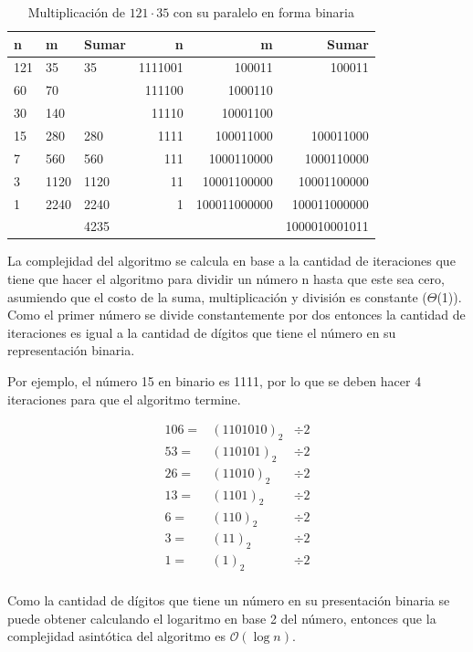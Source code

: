\documentclass[10pt,journal,compsoc]{IEEEtran}
\begin{document}
\begin{table}[t]
\centering
\label{tab:eje2}
\begin{tabular}{ll|l|rr|r}
n   & m    & Sumar & n & m & Sumar \\ \hline
121 & 35   & 35   & 1111001 & 100011& 100011  \\
60  & 70   &    & 111100 & 1000110  &   \\
30  & 140  &     & 11110 & 10001100  &  \\
15  & 280  & 280  & 1111 & 100011000 & 100011000 \\
7   & 560  & 560 & 111 & 1000110000  &  1000110000 \\
3   & 1120 & 1120 & 11 & 10001100000 &   10001100000 \\
1   & 2240 & 2240   & 1 & 100011000000 & 100011000000 \\ \hline
    &      & 4235 & & &1000010001011 
\end{tabular}
\caption{Multiplicación de $121\cdot 35$ con su paralelo en forma binaria}
\end{table}


La complejidad del algoritmo se calcula en base a la cantidad de iteraciones que tiene que hacer el algoritmo para dividir un número n hasta que este sea cero, asumiendo que el costo de la suma, multiplicación y división es constante ($\Theta$(1)). Como el primer número se divide constantemente por dos entonces la cantidad de iteraciones es igual a la cantidad de dígitos que tiene el número en su representación binaria. 

Por ejemplo, el número 15 en binario es 1111, por lo que se deben hacer 4 iteraciones para que el algoritmo termine.

\begin{center}

\[
\begin{array}{rll}
106 =  & (1101010)_2 & \div  2\\
53 = & (110101)_2 & \div 2 \\
26 = & (11010)_2 & \div 2 \\
13 = & (1101)_2 & \div 2 \\
6 = & (110)_2 & \div 2 \\
3 = & (11)_2 & \div 2 \\
1 = & (1)_2 & \div 2 \\
\end{array} 
\]
\end{center}

Como la cantidad de dígitos que tiene un número en su presentación binaria se puede obtener calculando el logaritmo en base 2 del número, entonces que la complejidad asintótica del algoritmo es $\mathcal{O}(\log{}n)$.
\end{document}
